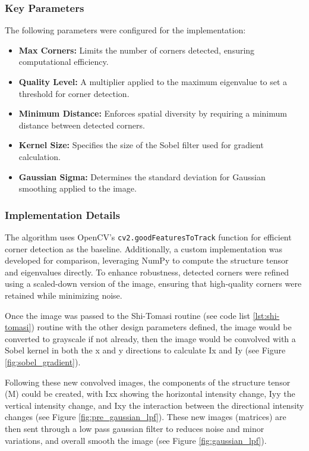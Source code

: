 \documentclass[11pt, conference, letterpaper]{IEEEtran}
\begin{document}
\subsubsection{Key Parameters}
The following parameters were configured for the implementation:
\begin{itemize}
    \item \textbf{Max Corners:} Limits the number of corners detected, ensuring computational efficiency.
    \item \textbf{Quality Level:} A multiplier applied to the maximum eigenvalue to set a threshold for corner detection.
    \item \textbf{Minimum Distance:} Enforces spatial diversity by requiring a minimum distance between detected corners.
    \item \textbf{Kernel Size:} Specifies the size of the Sobel filter used for gradient calculation.
    \item \textbf{Gaussian Sigma:} Determines the standard deviation for Gaussian smoothing applied to the image.
\end{itemize}
\bigskip

\subsubsection{Implementation Details}
The algorithm uses OpenCV's \texttt{cv2.goodFeaturesToTrack} function for efficient corner detection as the baseline. Additionally, a custom implementation was developed for comparison, leveraging NumPy to compute the structure tensor and eigenvalues directly.
To enhance robustness, detected corners were refined using a scaled-down version of the image, ensuring that high-quality corners were retained while minimizing noise. 

Once the image was passed to the Shi-Tomasi routine (see code list \ref{lst:shi-tomasi}) routine with the other design parameters defined, the image would be converted to grayscale if not already, then the image would be convolved with a Sobel kernel in both the x and y directions to calculate Ix and Iy (see Figure \ref{fig:sobel_gradient}). 

Following these new convolved images, the components of the structure tensor (M) could be created, with Ixx showing the horizontal intensity change, Iyy the vertical intensity change, and Ixy the interaction between the directional intensity changes (see Figure \ref{fig:pre_gaussian_lpf}). These new images (matrices) are then sent through a low pass gaussian filter to reduces noise and minor variations, and overall smooth the image (see Figure \ref{fig:gaussian_lpf}). 
\end{document}
